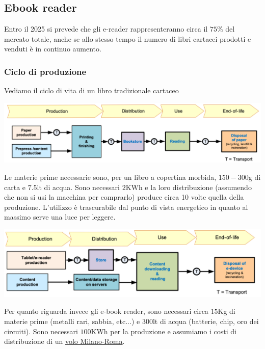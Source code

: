\newpage
\subsection{Ebook reader}
Entro il 2025 si prevede che gli e-reader rappresenteranno circa il $75\%$ del mercato totale, anche se allo stesso tempo il numero di libri cartacei prodotti e  venduti è in continuo aumento.

\subsubsection{Ciclo di produzione}
Vediamo il ciclo di vita di un libro tradizionale cartaceo
\begin{center}
	\includegraphics[scale=0.3]{books_lifecycle.png}
\end{center}
Le materie prime necessarie sono, per un libro a copertina morbida, $150-300$g di carta e $7.5$lt di acqua. Sono necessari $2$KWh  e la loro distribuzione (assumendo che non si usi la macchina per comprarlo) produce circa 10 volte quella della produzione. L'utilizzo è trascurabile dal punto di vista energetico in quanto al massimo serve una luce per leggere.
\begin{center}
	\includegraphics[scale=0.3]{ereader_lifecycle.png}
\end{center}
Per quanto riguarda invece gli e-book reader, sono necessari circa $15$Kg di materie prime (metalli rari, sabbia, etc...) e $300$lt di acqua (batterie, chip, oro dei circuiti). Sono necessari $100$KWh per la produzione e assumiamo i costi di distribuzione di un  \href{https://www.icao.int/environmental-protection/Carbonoffset/Pages/default.aspx}{\color{blue}volo Milano-Roma}.

